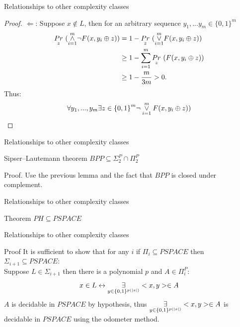         \begin{frame}{Relationships to other complexity classes}
            \begin{proof}
                $\Leftarrow$: Suppose $x \notin L$, then for an arbitrary
                sequence $y_1,...y_m \in {\{0,1\}}^{m}$
                \begin{align*}
                    \underset{z}{Pr} \
                    (\andd{i=1}{m} \neg F(x,y_i\oplus z))
                    & = 1 -\underset{z}{Pr}\ 
                        (\orr{i=1}{m} F(x,y_i\oplus z)) \\
                    & \geq 1- \sum\limits_{i=1}^m
                     \underset{z}{Pr}\ 
                     (F(x,y_i\oplus z)) \\
                    & \geq 1-  \frac{m}{3m} >0.
                \end{align*}
                Thus:
                $$\forall y_1,...,y_m \exists z \in {\{0,1\}}^m
                    \neg \orr{i=1}{m} F(x,y_i\oplus z)) $$
            \end{proof}
        \end{frame}
                
        \begin{frame}{Relationships to other complexity classes}
            \begin{block}{Sipser–Lautemann theorem}
                $BPP \subseteq \Sigma_2^P \cap \Pi_2^P$
            \end{block}
            \begin{block}{Proof.}
                Use the previous lemma and the fact that $BPP$ is closed
                under complement.
            \end{block}
        \end{frame}

        \begin{frame}{Relationships to other  complexity classes}
            \begin{block}{Theorem}
                $PH \subseteq PSPACE$
            \end{block}
        \end{frame}

        \begin{frame}{Relationships to other  complexity classes}
            \begin{block}{Proof}
                It is sufficient to show that for any $i$ if $\Pi_i \subseteq PSPACE$ then $\Sigma_{i+1} \subseteq PSPACE$:\\
                Suppose $L \in \Sigma_{i+1}$ then there is a polynomial $p$ and $A \in \Pi_i^P$:
                $$x \in L \leftrightarrow \existss{y\in \{0,1\}^{p(|x|)}}{} <x,y> \in A$$
                $A$ is decidable in $PSPACE$ by hypothesis, 
                thus $\existss{y\in \{0,1\}^{p(|x|)}}{} <x,y> \in A$
                 is decidable in $PSPACE$ using the odometer method.
            \end{block}
        \end{frame}

